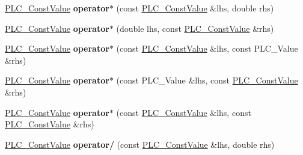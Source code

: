 \begin{DoxyCompactItemize}
\item 
\hypertarget{classns3_1_1PLC__ConstValue_afebdfbc99eb1b4977d34e32f89b8cb66}{\hyperlink{classns3_1_1PLC__ConstValue}{\-P\-L\-C\-\_\-\-Const\-Value} {\bfseries operator$\ast$} (const \hyperlink{classns3_1_1PLC__ConstValue}{\-P\-L\-C\-\_\-\-Const\-Value} \&lhs, double rhs)}\label{classns3_1_1PLC__ConstValue_afebdfbc99eb1b4977d34e32f89b8cb66}

\item 
\hypertarget{classns3_1_1PLC__ConstValue_af2ece9bb69f7a412b33cc96388c7e497}{\hyperlink{classns3_1_1PLC__ConstValue}{\-P\-L\-C\-\_\-\-Const\-Value} {\bfseries operator$\ast$} (double lhs, const \hyperlink{classns3_1_1PLC__ConstValue}{\-P\-L\-C\-\_\-\-Const\-Value} \&rhs)}\label{classns3_1_1PLC__ConstValue_af2ece9bb69f7a412b33cc96388c7e497}

\item 
\hypertarget{classns3_1_1PLC__ConstValue_a47e4d94e3ce4e3f7c1d68a4e043ae3fe}{\hyperlink{classns3_1_1PLC__ConstValue}{\-P\-L\-C\-\_\-\-Const\-Value} {\bfseries operator$\ast$} (const \hyperlink{classns3_1_1PLC__ConstValue}{\-P\-L\-C\-\_\-\-Const\-Value} \&lhs, const \-P\-L\-C\-\_\-\-Value \&rhs)}\label{classns3_1_1PLC__ConstValue_a47e4d94e3ce4e3f7c1d68a4e043ae3fe}

\item 
\hypertarget{classns3_1_1PLC__ConstValue_a879d1f4bd91bdbd9397f712f59604c01}{\hyperlink{classns3_1_1PLC__ConstValue}{\-P\-L\-C\-\_\-\-Const\-Value} {\bfseries operator$\ast$} (const \-P\-L\-C\-\_\-\-Value \&lhs, const \hyperlink{classns3_1_1PLC__ConstValue}{\-P\-L\-C\-\_\-\-Const\-Value} \&rhs)}\label{classns3_1_1PLC__ConstValue_a879d1f4bd91bdbd9397f712f59604c01}

\item 
\hypertarget{classns3_1_1PLC__ConstValue_aa04584acc50cbcf959cb72c297ad1093}{\hyperlink{classns3_1_1PLC__ConstValue}{\-P\-L\-C\-\_\-\-Const\-Value} {\bfseries operator$\ast$} (const \hyperlink{classns3_1_1PLC__ConstValue}{\-P\-L\-C\-\_\-\-Const\-Value} \&lhs, const \hyperlink{classns3_1_1PLC__ConstValue}{\-P\-L\-C\-\_\-\-Const\-Value} \&rhs)}\label{classns3_1_1PLC__ConstValue_aa04584acc50cbcf959cb72c297ad1093}

\item 
\hypertarget{classns3_1_1PLC__ConstValue_aeea1344cbd77a95218cf7350ee722c83}{\hyperlink{classns3_1_1PLC__ConstValue}{\-P\-L\-C\-\_\-\-Const\-Value} {\bfseries operator/} (const \hyperlink{classns3_1_1PLC__ConstValue}{\-P\-L\-C\-\_\-\-Const\-Value} \&lhs, double rhs)}\label{classns3_1_1PLC__ConstValue_aeea1344cbd77a95218cf7350ee722c83}


\end{DoxyCompactItemize}
